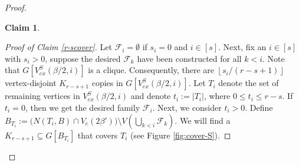 \documentclass[11pt, a4paper]{article}
\newtheorem{claim}[theorem]{Claim}
\theoremstyle{definition}
\newcommand{\<}{\subseteq}
\begin{document}
\begin{proof}
\begin{claim}
    
    
    
\end{claim}
\begin{proof}[Proof of Claim \ref{r-scover}]
Let $\mathcal{F}_i=\emptyset$ if $s_i=0$ and $i\in [s]$. Next, fix an $i\in [s]$ with $s_i>0$, suppose the desired $\mathcal{F}_k$ have been constructed for all $k < i$. Note that %
$G[V_{ex}^S(\beta/2,i)]$ is a clique. Consequently, there are $\left\lfloor s_i/(r-s+1)\right\rfloor$ vertex-disjoint $K_{r-s+1}$ copies in $G[V_{ex}^S(\beta/2,i)]$. Let $T_i$ denote the set of remaining vertices in $V_{ex}^S(\beta/2,i)$ and denote $t_i:=|T_i|$, where $0\leq t_i \leq r-s$. %
If $t_i=0$, then we get the desired family  $\mathcal{F}_i$.  Next, we consider $t_i>0$. Define $B_{T_i}:=\big (N(T_i,B)\cap V_e(2\beta')\big)\setminus V(\bigcup_{k<i}\mathcal{F}_k)$.   We will find a $K_{r-s+1}\subseteq G[B_{T_i}]$ that covers $T_i$ (see Figure \ref{fig:cover-S}). %


\end{proof}
\end{proof}
\end{document}
